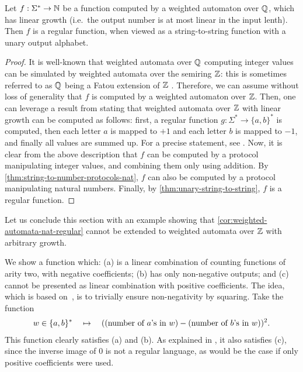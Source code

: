 \begin{corollary}
  \label{cor:weighted-automata-nat-regular}
  Let $f : \Sigma^* \to {\mathbb N}$ be a function computed by a weighted automaton
  over  ${\mathbb Q}$, which has linear growth (i.e.~the output number is at most linear in the input lenth). Then $f$ is a regular function, when viewed as a string-to-string function with a unary output alphabet.
\end{corollary}
\begin{proof}
  It is well-known that weighted automata over ${\mathbb Q}$ computing integer values
  can be simulated by weighted automata over the semiring ${\mathbb Z}$: this is
  sometimes referred to as ${\mathbb Q}$ being a Fatou extension of ${\mathbb Z}$
  \cite[p. 110]{BerstelReutenauer08}.
  Therefore, we can assume without loss of generality that $f$ is computed by
  a weighted automaton over ${\mathbb Z}$. Then, one can leverage a 
  result from \cite{Zpolyreg23} stating that weighted automata over ${\mathbb Z}$
  with linear growth can be computed as follows: first, a regular function $g : \Sigma^* \to
  \{a,b\}^*$ is computed, then each letter $a$ is mapped to $+1$ and each 
  letter $b$ is mapped to $-1$, and finally all values are summed up. 
  For a precise statement, see \cite[Proposition II.13, Theorem III.3]{Zpolyreg23}.
  Now, it is clear from the above description that $f$ can be computed by a protocol
  manipulating integer values, and combining them only using addition. By
  \cref{thm:string-to-number-protocols-nat}, $f$ can also be computed by a
  protocol manipulating natural numbers. Finally, by \cref{thm:unary-string-to-string},
  $f$ is a regular function.
\end{proof}

Let us conclude this section with an example showing that
\cref{cor:weighted-automata-nat-regular} cannot be extended to weighted
automata over ${\mathbb Z}$ with arbitrary growth.

\begin{myexample}\label{ex:quadratic-counterexample}
     We show  a function which: (a) is a linear combination of \mso  counting functions of arity two, with negative coefficients; (b) has only non-negative outputs; and (c) cannot be presented as linear combination with positive coefficients. The idea, which is based on~\cite[Example 2.1]{BerstelReutenauer08}, is to trivially ensure non-negativity by squaring. Take the function
\begin{align*}
w \in \{a,b\}^* 
\quad \mapsto \quad 
(\text{(number of $a$'s in $w$)} - \text{(number of $b$'s in $w$)})^2.
\end{align*}
This function clearly satisfies (a) and (b). As explained in \cite[p.3]{Zpolyreg23}, it also satisfies (c), since the inverse image of $0$ is not a regular language, as would be the case if only positive coefficients were used.
\end{myexample}
